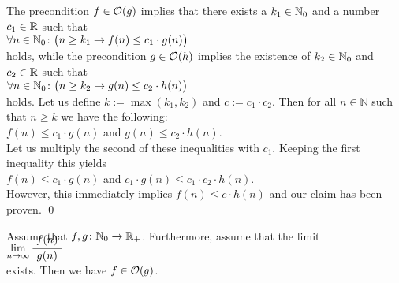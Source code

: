 \proof
The precondition $f \in \mathcal{O}(g)$ implies that there exists a $k_1 \in {\mathbb N}_0$ and a number $c_1 \in {\mathbb R}$
such that 
\\[0.2cm]
\hspace*{1.3cm} 
$\forall n \in {\mathbb N}_0 \colon\bigl( n \geq k_1 \rightarrow f(n) \leq c_1 \cdot g(n)\bigr)$ 
\\[0.2cm]
holds, while the precondition $g \in \mathcal{O}(h)$ implies the existence of $k_2 \in {\mathbb N}_0$ and $c_2 \in {\mathbb R}$
such that \\[0.2cm]
\hspace*{1.3cm} 
$\forall n \in {\mathbb N}_0 \colon\bigl( n \geq k_2 \rightarrow g(n) \leq c_2 \cdot h(n)\bigr)$ 
\\[0.2cm]
holds.  Let us define $k:= \max(k_1,k_2)$ and $c := c_1 \cdot c_2$.  Then for all $n \in \mathbb{N}$
such that $n \geq k$ we have the following:
\\[0.2cm]
\hspace*{1.3cm}
$f(n) \leq c_1\cdot g(n)$ \quad and \quad $g(n) \leq c_2 \cdot h(n)$. 
\\[0.2cm]
Let us multiply the second of these inequalities with $c_1$.  Keeping the first inequality this yields
\\[0.2cm]
\hspace*{1.3cm}
$f(n) \leq c_1\cdot g(n)$  \quad and \quad $c_1\cdot g(n) \leq c_1\cdot c_2 \cdot h(n)$. 
\\[0.2cm]
However, this immediately implies $f(n) \leq c \cdot h(n)$ and our claim has been proven. 
\qed

\begin{Proposition} \label{limit}
  Assume that $f,g \colon {\mathbb N}_0 \rightarrow {{\mathbb R}_+}$.   Furthermore, assume that the limit 
  \\[0.2cm]
  \hspace*{3.3cm}
 $\lim\limits_{n \rightarrow \infty} \bruch{\,f(n)\,}{g(n)}$
  \\[0.2cm]
  exists.  Then we have $f \in \mathcal{O}(g)$. 
\end{Proposition}

